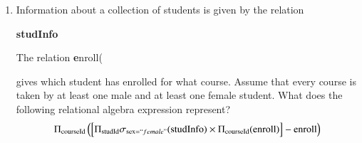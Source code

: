 \documentclass[journal,12pt,onecolumn]{IEEEtran}
\theoremstyle{remark}
\begin{document}
\begin {center}
\begin{enumerate}
\begin{minipage}{0.45\linewidth}
\begin{lstlisting}[language=C]
/* P1 */
while (true) {
    wants1 = true;
    while (wants2 == true);
    /* Critical Section */
    wants1 = false;
}
/* Remainder section */
\end{lstlisting}
\end{minipage}
\hfill
\begin{minipage}{0.45\linewidth}
\begin{lstlisting}[language=C]
/* P2 */
while (true) {
    wants2 = true;
    while (wants1 == true);
    /* Critical Section */
    wants2 = false;
}
/* Remainder section */
\end{lstlisting}
\end{minipage}

\bigskip

Here, wants1 and wants2 are shared variables, initialized to false
Which one of the following statements is \textbf{TRUE }about the above construct?
\begin{enumerate}
\item It does not ensure mutual exclusion. 
\item It does not ensure bounded waiting. 
\item  It requires that processes enter the critical section in strict alternation. 
\item It does not prevent deadlocks, but ensures mutual exclusion.
\end{enumerate}
\hfill \textbf{(GATE EE 2025)}
 
\item  Information about a collection of students is given by the relation 

\textbf{studInfo}

The relation 
\textbf enroll(

gives which student has enrolled for  what course. Assume that every course is taken by at least one male and at least one female student. What does the following relational algebra expression represent?
\begin{align}
\Pi_{\text{courseId}} \left( \left[ \Pi_{\text{studId}} \sigma_{\text{sex} = ``female"} (\text{studInfo}) \times \Pi_{\text{courseId}} (\text{enroll}) \right] - \text{enroll} \right)
\end{align}


\end{enumerate}
\end{center}
\end{document}

